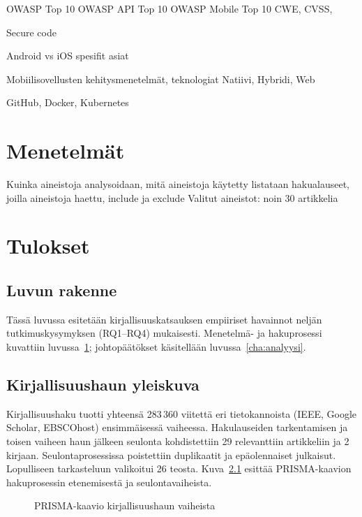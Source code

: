 \documentclass[bscthesis,finnish,oneside,biblatex]{uefcsthesis}
\begin{document}
OWASP Top 10
OWASP API Top 10
OWASP Mobile Top 10
CWE, CVSS,

Secure code

Android vs iOS spesifit asiat

Mobiilisovellusten kehitysmenetelmät, teknologiat
Natiivi, Hybridi, Web

GitHub, Docker, Kubernetes

\chapter{Menetelmät}
\label{cha:menetelmat}
Kuinka aineistoja analysoidaan, mitä aineistoja käytetty
listataan hakualauseet, joilla aineistoja haettu, include ja exclude
Valitut aineistot: noin 30 artikkelia

\chapter{Tulokset}
\label{cha:tulokset}

\section*{Luvun rakenne}
Tässä luvussa esitetään kirjallisuuskatsauksen empiiriset havainnot
neljän tutkimuskysymyksen (RQ1–RQ4) mukaisesti.  Menetelmä- ja
hakuprosessi kuvattiin luvussa~\ref{cha:menetelmat}; johtopäätökset
käsitellään luvussa~\ref{cha:analyysi}.

\section{Kirjallisuushaun yleiskuva}

Kirjallisuushaku tuotti yhteensä 283\,360 viitettä eri tietokannoista (IEEE, Google Scholar, EBSCOhost) ensimmäisessä vaiheessa.
Hakulauseiden tarkentamisen ja toisen vaiheen haun jälkeen seulonta kohdistettiin 29 relevanttiin artikkeliin ja 2 kirjaan.
Seulontaprosessissa poistettiin duplikaatit ja epäolennaiset julkaisut. Lopulliseen tarkasteluun valikoitui 26 teosta.
Kuva~\ref{fig:prisma} esittää PRISMA-kaavion hakuprosessin etenemisestä ja seulontavaiheista.


\begin{figure}[h]
  \centering
  \caption{PRISMA-kaavio kirjallisuushaun vaiheista}
  \label{fig:prisma}
\end{figure}
\end{document}
